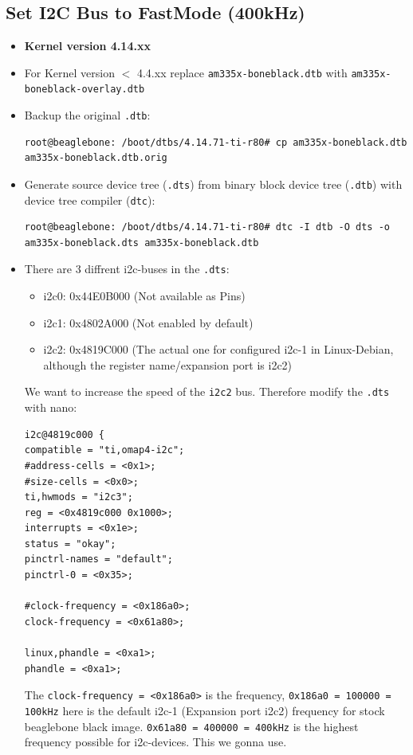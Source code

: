 \documentclass[
	fontsize=10pt
	paper=a4
]{scrartcl}
\begin{document}
\subsection{Set I2C Bus to FastMode (400kHz)}
\begin{itemize}
\item \textbf{Kernel version 4.14.xx}

\item For Kernel version $<$ 4.4.xx replace
\texttt{am335x-boneblack.dtb} with \texttt{am335x-boneblack-overlay.dtb}

\item Backup the original \texttt{.dtb}:
\begin{lstlisting}
root@beaglebone: /boot/dtbs/4.14.71-ti-r80# cp am335x-boneblack.dtb am335x-boneblack.dtb.orig
\end{lstlisting}

\item Generate source device tree (\texttt{.dts}) from  binary block device tree (\texttt{.dtb}) with device tree compiler (\texttt{dtc}):
\begin{lstlisting}
root@beaglebone: /boot/dtbs/4.14.71-ti-r80# dtc -I dtb -O dts -o am335x-boneblack.dts am335x-boneblack.dtb
\end{lstlisting}

\item There are 3 diffrent i2c-buses in the \texttt{.dts}:
\begin{itemize}
	\item i2c0: 0x44E0B000 (Not available as Pins)
	\item i2c1: 0x4802A000 (Not enabled by default)
	\item i2c2: 0x4819C000 (The actual one for configured i2c-1 in Linux-Debian, although the register name/expansion port is i2c2)
\end{itemize}
We want to increase the speed of the \texttt{i2c2} bus. 
Therefore modify the \texttt{.dts} with nano:
\begin{lstlisting}
i2c@4819c000 {
compatible = "ti,omap4-i2c";
#address-cells = <0x1>;
#size-cells = <0x0>;
ti,hwmods = "i2c3";
reg = <0x4819c000 0x1000>;
interrupts = <0x1e>;
status = "okay";
pinctrl-names = "default";
pinctrl-0 = <0x35>;

#clock-frequency = <0x186a0>;
clock-frequency = <0x61a80>;

linux,phandle = <0xa1>;
phandle = <0xa1>;
\end{lstlisting}
The \texttt{clock-frequency = <0x186a0>} is the frequency, \texttt{0x186a0 = 100000 = 100kHz} here is the default i2c-1 (Expansion port i2c2) frequency for stock beaglebone black image.
\texttt{0x61a80 = 400000 = 400kHz} is the highest frequency possible for i2c-devices.
This we gonna use. 


\end{itemize}
\end{document}
